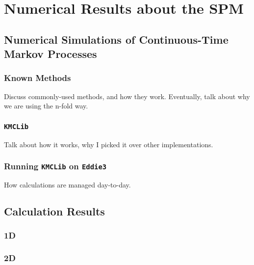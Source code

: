 \chapter{Numerical Results about the SPM}

\section{Numerical Simulations of Continuous-Time Markov Processes}
\subsection{Known Methods}
Discuss commonly-used methods, and how they work. Eventually, talk about why we are using the n-fold way.
\subsection{\texttt{KMCLib}}
Talk about how it works, why I picked it over other implementations.
\subsection{Running \texttt{KMCLib} on \texttt{Eddie3}}
How calculations are managed day-to-day.

\section{Calculation Results }
\subsection{1D}
\subsection{2D}
